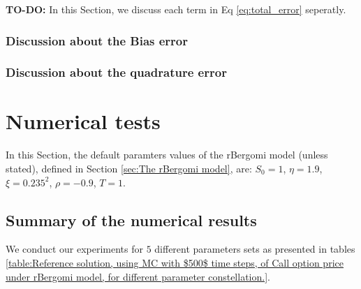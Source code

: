 \documentclass[11pt]{article}
\begin{document}
\textbf{TO-DO:} In this Section, we discuss each term in Eq \ref{eq:total_error} seperatly.
\subsubsection{Discussion about the Bias error}
\subsubsection{Discussion about the quadrature error}

\section{Numerical tests}\label{sec:Numerical tests}
In this Section, the default paramters values of the rBergomi model  (unless stated), defined in Section \ref{sec:The rBergomi model}, are: $S_0=1$, $\eta=1.9$, $\xi=0.235^2$, $\rho=-0.9$, $T=1$. 

\subsection{Summary of the numerical results}

We conduct our experiments for $5$ different parameters  sets as presented in tables \ref{table:Reference solution, using MC with $500$ time steps, of Call option price under rBergomi model, for different parameter constellation.}. 
\end{document}
